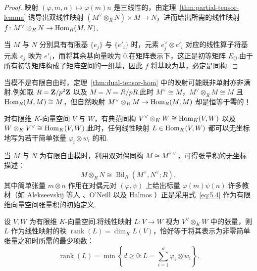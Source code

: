 \begin{proof}
映射 $(\varphi, m, n) \mapsto \varphi(m)n$ 是三线性的，由定理~\ref{thm:partial-tensor-lemma} 诱导出双线性映射 $(M^\vee \otimes_R N) \times M \to N$，进而给出所需的线性映射 $f \colon M^\vee \otimes_R N \to \operatorname{Hom}_R(M, N)$.

当 $M$ 与 $N$ 分别具有有限基 $\{e_j\}$ 与 $\{e'_i\}$ 时，元素 $e_j^\vee \otimes e'_i$ 对应的线性算子将基元素 $e_j$ 映为 $e'_i$，而将其余基向量映为 $0$.在矩阵表示下，这正是初等矩阵 $E_{ij}$.由于所有初等矩阵构成了矩阵空间的一组基，因此 $f$ 将基映为基，必定是同构.
\end{proof}

\begin{remark}\label{rem:dual-tensor-failure}
当模不是有限自由时，定理~\ref{thm:dual-tensor-hom} 中的映射可能既非单射亦非满射.例如取 $R = \mathbf{Z}/p^2\mathbf{Z}$ 以及 $M = N = R/pR$.此时 $M^\vee \cong M$，$M^\vee \otimes_R M \cong M$ 且 $\operatorname{Hom}_R(M, M) \cong M$，但自然映射 $M^\vee \otimes_R M \to \operatorname{Hom}_R(M, M)$ 却是恒等于零的！
\end{remark}

\begin{example}\label{ex:vector-space-dual-tensor}
对有限维 $K$-向量空间 $V$ 与 $W$，有典范同构 $V^\vee \otimes_K W \cong \operatorname{Hom}_K(V, W)$ 以及 $W \otimes_K V^\vee \cong \operatorname{Hom}_K(V, W)$.此时，任何线性映射 $L \in \operatorname{Hom}_K(V, W)$ 都可以无坐标地写为若干简单张量 $\varphi_i \otimes w_i$ 的和.

当 $M$ 与 $N$ 为有限自由模时，利用双对偶同构 $M \cong M^{\vee\vee}$，可得张量积的无坐标描述：
\begin{equation}
  M \otimes_R N \cong \operatorname{Bil}_R(M^\vee, N^\vee; R), \label{eq:5.4}
\end{equation}
其中简单张量 $m \otimes n$ 作用在对偶元对 $(\varphi, \psi)$ 上给出标量 $\varphi(m)\psi(n)$.许多教材（如 Alekseevskij 等人 \cite[第~65~页]{alekseevskij}、O'Neill \cite[第~35~页]{oneill} 以及 Halmos \cite[第~40~页]{halmos}）正是采用式~\eqref{eq:5.4} 作为有限维向量空间张量积的初始定义.
\end{example}

\begin{theorem}[张量秩与线性映射的秩]\label{thm:tensor-rank}
设 $V, W$ 为有限维 $K$-向量空间.将线性映射 $L \colon V \to W$ 视为 $V^\vee \otimes_K W$ 中的张量，则 $L$ 作为线性映射的秩 $\operatorname{rank}(L) = \dim_K L(V)$，恰好等于将其表示为非零简单张量之和时所需的最少项数：
\[
  \operatorname{rank}(L) = \min\left\{d \geq 0 : L = \sum_{i=1}^d \varphi_i \otimes w_i\right\}.
\]
\end{theorem}


